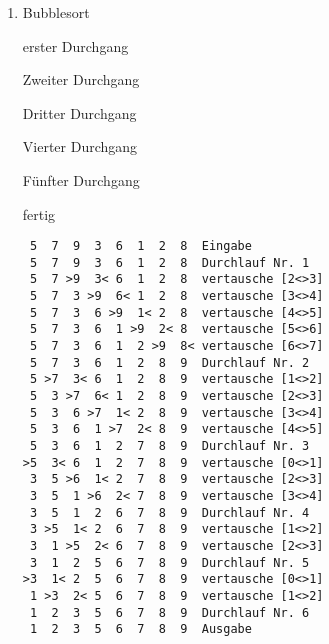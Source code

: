 \documentclass{bschlangaul-aufgabe}
\begin{document}
\begin{enumerate}


\item Bubblesort

\begin{bAntwort}
erster Durchgang




Zweiter Durchgang




Dritter Durchgang






Vierter Durchgang





Fünfter Durchgang




fertig


\begin{verbatim}
 5  7  9  3  6  1  2  8  Eingabe
 5  7  9  3  6  1  2  8  Durchlauf Nr. 1
 5  7 >9  3< 6  1  2  8  vertausche [2<>3]
 5  7  3 >9  6< 1  2  8  vertausche [3<>4]
 5  7  3  6 >9  1< 2  8  vertausche [4<>5]
 5  7  3  6  1 >9  2< 8  vertausche [5<>6]
 5  7  3  6  1  2 >9  8< vertausche [6<>7]
 5  7  3  6  1  2  8  9  Durchlauf Nr. 2
 5 >7  3< 6  1  2  8  9  vertausche [1<>2]
 5  3 >7  6< 1  2  8  9  vertausche [2<>3]
 5  3  6 >7  1< 2  8  9  vertausche [3<>4]
 5  3  6  1 >7  2< 8  9  vertausche [4<>5]
 5  3  6  1  2  7  8  9  Durchlauf Nr. 3
>5  3< 6  1  2  7  8  9  vertausche [0<>1]
 3  5 >6  1< 2  7  8  9  vertausche [2<>3]
 3  5  1 >6  2< 7  8  9  vertausche [3<>4]
 3  5  1  2  6  7  8  9  Durchlauf Nr. 4
 3 >5  1< 2  6  7  8  9  vertausche [1<>2]
 3  1 >5  2< 6  7  8  9  vertausche [2<>3]
 3  1  2  5  6  7  8  9  Durchlauf Nr. 5
>3  1< 2  5  6  7  8  9  vertausche [0<>1]
 1 >3  2< 5  6  7  8  9  vertausche [1<>2]
 1  2  3  5  6  7  8  9  Durchlauf Nr. 6
 1  2  3  5  6  7  8  9  Ausgabe
\end{verbatim}
\end{bAntwort}


\end{enumerate}
\end{document}

